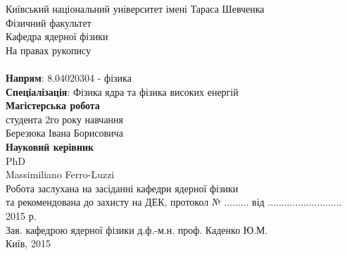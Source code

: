 \begin{titlepage}
{\center
  Київський національний університет імені Тараса Шевченка\\
  Фізичний факультет\\
  Кафедра ядерної фізики\\[1cm]}
{\flushright \small
  На правах рукопису\\[4cm]}
{\center \large \bf \thesistopicUA \\[2cm]}
{\flushleft
  {\bf Напрям}: 8.04020304 - фізика\\
   {\bf Спеціалізація}: Фізика ядра та фізика високих енергій\\[1cm]
  \leftskip=7.4cm
  {\bf Магістерська робота\\}
  студента 2го року навчання\\
  Березюка Івана Борисовича\\[1cm]
  {\bf Науковий керівник\\}
  PhD\\
  Massimiliano  Ferro-Luzzi \\[2.2cm]}
{\small \noindent
  Робота заслухана на засіданні кафедри ядерної фізики\\
  та рекомендована до захисту на ДЕК, протокол № ......... від ........................... 2015 р.\\[0.4cm]
  Зав. кафедрою ядерної фізики \hspace{1.8cm} д.ф.-м.н. проф. Каденко Ю.М.\\[0.7cm]}
{\center Київ, 2015\\}
\end{titlepage}
